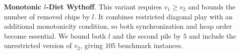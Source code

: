 \documentclass[review]{elsarticle}
\newcommand{\set}[1]{\{ #1 \}}
\newcommand{\tuple}[1]{\langle {#1} \rangle}
\newcommand{\true}{\top}
\newcommand{\statevar}{\mathcal{X}}
\newcommand{\act}{\mathcal{A}}
\newcommand{\constraint}{\mathcal{C}}
\newcommand{\estate}{\mathcal{E}}
\newcommand{\pre}{\mathtt{pre}}
\newcommand{\eff}{\mathtt{eff}}
\begin{document}
\textbf{Monotonic $l$-Diet Wythoff}. This variant requires $v_1 \ge v_2$ and bounds the number of removed chips by $l$.
It combines restricted diagonal play with an additional monotonicity condition, so both synchronization and heap order become essential.
We bound both $l$ and the second pile by $5$ and include the unrestricted version of $v_2$, giving $105$ benchmark instances.
\end{document}
